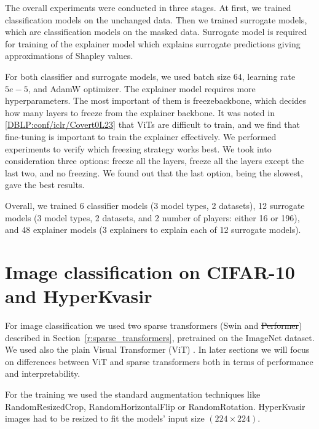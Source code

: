 \documentclass[magisterska,en]{pracamgr}
\begin{document}
The overall experiments were conducted in three stages. At first, we trained classification models on the unchanged data. Then we trained surrogate models, which are classification models on the masked data. Surrogate model is required for training of the explainer model which explains surrogate predictions giving approximations of Shapley values.

For both classifier and surrogate models, we used batch size $64$, learning rate $5e-5$, and AdamW optimizer. The explainer model requires more hyperparameters. The most important of them is freeze\textunderscore backbone, which decides how many layers to freeze from the explainer backbone. It was noted in \ref{DBLP:conf/iclr/Covert0L23} that ViTs are difficult to train, and we find that fine-tuning is important to train the explainer effectively. We performed experiments to verify which freezing strategy works best. We took into consideration three options: freeze all the layers, freeze all the layers except the last two, and no freezing. We found out that the last option, being the slowest, gave the best results.

Overall, we trained 6 classifier models (3 model types, 2 datasets), 12 surrogate models (3 model types, 2 datasets, and 2 number of players: either 16 or 196), and 48 explainer models (3 explainers to explain each of 12 surrogate models).


\section{Image classification on CIFAR-10 and HyperKvasir}

For image classification we used two sparse transformers (Swin and \sout{Performer}) described in Section~\ref{r:sparse_transformers}, pretrained on the ImageNet dataset. We used also the plain Visual Transformer (ViT) \cite{DBLP:conf/iclr/DosovitskiyB0WZ21}. In later sections we will focus on differences between ViT and sparse transformers both in terms of performance and interpretability.

For the training we used the standard augmentation techniques like RandomResizedCrop, RandomHorizontalFlip or RandomRotation. HyperKvasir images had to be resized to fit the models' input size $(224\times 224)$.
\end{document}
